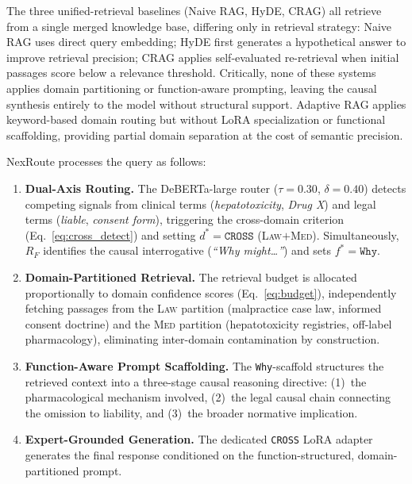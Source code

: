 \documentclass[a4paper,fleql]{cas-sc}
\begin{document}
The three unified-retrieval baselines (Naive RAG, HyDE, CRAG) all retrieve
from a single merged knowledge base, differing only in retrieval strategy:
Naive RAG uses direct query embedding; HyDE first generates a hypothetical
answer to improve retrieval precision; CRAG applies self-evaluated re-retrieval
when initial passages score below a relevance threshold. Critically, none of
these systems applies domain partitioning or function-aware prompting,
leaving the causal synthesis entirely to the model without structural support.
Adaptive RAG applies keyword-based domain routing but without LoRA
specialization or functional scaffolding, providing partial domain separation
at the cost of semantic precision.

NexRoute processes the query as follows:
\begin{enumerate}
    \item \textbf{Dual-Axis Routing.} The DeBERTa-large router
    ($\tau{=}0.30$, $\delta{=}0.40$) detects competing signals from clinical
    terms (\textit{hepatotoxicity}, \textit{Drug X}) and legal terms
    (\textit{liable}, \textit{consent form}), triggering the cross-domain
    criterion (Eq.~\ref{eq:cross_detect}) and setting $d^* = \texttt{CROSS}$
    (\textsc{Law}$+$\textsc{Med}). Simultaneously, $R_F$ identifies the causal
    interrogative (\textit{``Why might\ldots''}) and sets
    $f^* = \texttt{Why}$.

    \item \textbf{Domain-Partitioned Retrieval.} The retrieval budget is
    allocated proportionally to domain confidence scores
    (Eq.~\ref{eq:budget}), independently fetching passages from the
    \textsc{Law} partition (malpractice case law, informed consent doctrine)
    and the \textsc{Med} partition (hepatotoxicity registries, off-label
    pharmacology), eliminating inter-domain contamination by construction.

    \item \textbf{Function-Aware Prompt Scaffolding.} The \texttt{Why}-scaffold
    structures the retrieved context into a three-stage causal reasoning
    directive: (1)~the pharmacological mechanism involved, (2)~the legal causal
    chain connecting the omission to liability, and (3)~the broader normative
    implication.

    \item \textbf{Expert-Grounded Generation.} The dedicated \texttt{CROSS}
    LoRA adapter generates the final response conditioned on the
    function-structured, domain-partitioned prompt.
\end{enumerate}
\end{document}
